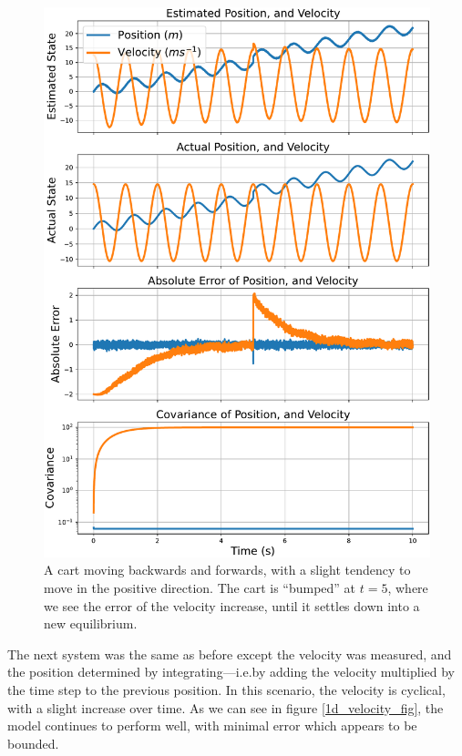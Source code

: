 \documentclass[12pt]{article}
\begin{document}
\begin{figure}[thp]
	\centering
	
	\includegraphics[width=\textwidth]{1d-position.pdf}
	
	\caption{A cart moving backwards and forwards, with a slight tendency to move in the positive direction. The cart is ``bumped'' at $t=5$, where we see the error of the velocity increase, until it settles down into a new equilibrium.}
	\label{1d_position_fig}
\end{figure}

The next system was the same as before except the velocity was measured, and the position determined by integrating---i.e.\@ by adding the velocity multiplied by the time step to the previous position. In this scenario, the velocity is cyclical, with a slight increase over time. As we can see in figure \ref{1d_velocity_fig}, the model continues to perform well, with minimal error which appears to be bounded.
\end{document}
